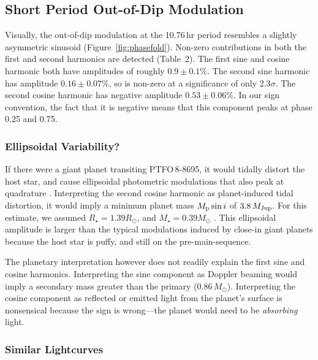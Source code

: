 \documentclass[12pt,twocolumn,tighten]{aastex62}
\newcommand{\ptfo}{PTFO$\,$8-8695}
\begin{document}
\subsection{Short Period Out-of-Dip Modulation}

Visually, the out-of-dip modulation at the 10.76$\,$hr period
resembles a slightly asymmetric sinusoid (Figure~\ref{fig:phasefold}).
Non-zero contributions in both the first and second harmonics are
detected (Table~2).  The first sine and cosine harmonic both have
amplitudes of roughly $0.9\pm0.1\%$.  The second sine harmonic has
amplitude $0.16 \pm 0.07\%$, so is non-zero at a significance of only
2.3$\sigma$.  The second cosine harmonic has negative amplitude $0.53
\pm 0.06\%$.  In our sign convention, the fact that it is negative
means that this component peaks at phase 0.25 and 0.75.

\subsubsection{Ellipsoidal Variability?}
If there were a giant planet transiting \ptfo, it would tidally
distort the host star, and cause ellipsoidal photometric modulations
that also peak at quadrature \citep[see][]{shporer_astrophysics_2017}.
Interpreting the second cosine harmonic as planet-induced tidal
distortion, it would imply a minimum planet mass $M_{\rm p} \sin i$ of
$3.8\,M_{\rm Jup}$.  For this estimate, we assumed $R_\star = 1.39
R_\odot$, and $M_\star = 0.39 M_\odot$ \citep{van_eyken_ptf_2012}.
This ellipsoidal amplitude is larger than the typical modulations
induced by close-in giant planets because the host star is puffy, and
still on the pre-main-sequence.

The planetary interpretation however does not readily explain the
first sine and cosine harmonics.  Interpreting the sine component as
Doppler beaming would imply a secondary mass greater than the primary
($0.86\,M_\odot$).  Interpreting the cosine component as reflected or
emitted light from the planet's surface is nonsensical because the
sign is wrong---the planet would need to be {\it absorbing} light.

\subsubsection{Similar Lightcurves}
\label{subsec:dipstars}
\end{document}
